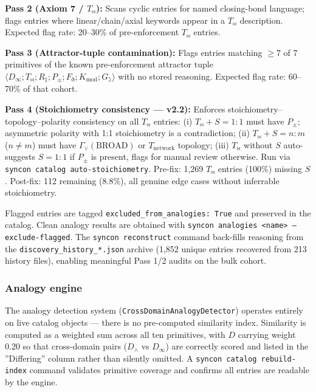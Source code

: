 \documentclass[12pt,a4paper]{article}
\begin{document}
\textbf{Pass 2 (Axiom 7 / $T_{\bowtie}$):} Scans cyclic entries for named closing-bond language; flags entries where linear/chain/axial keywords appear in a $T_{\bowtie}$ description. Expected flag rate: 20--30\% of pre-enforcement $T_{\bowtie}$ entries.

\textbf{Pass 3 (Attractor-tuple contamination):} Flags entries matching $\geq$7 of 7 primitives of the known pre-enforcement attractor tuple $\langle D_{\infty}; T_{\bowtie}; R_{\ddagger}; P_{\pm}; F_{\eth}; K_{\text{mod}}; G_{\gimel} \rangle$ with no stored reasoning. Expected flag rate: 60--70\% of that cohort.

\textbf{Pass 4 (Stoichiometry consistency --- v2.2):} Enforces stoichiometry--topology--polarity consistency on all $T_{\bowtie}$ entries: (i) $T_{\bowtie} + S = 1:1$ must have $P_{\pm}$; asymmetric polarity with 1:1 stoichiometry is a contradiction; (ii) $T_{\bowtie} + S = n:m$ ($n \neq m$) must have $\Gamma_{\vee}(\text{BROAD})$ or $T_{\text{network}}$ topology; (iii) $T_{\bowtie}$ without $S$ auto-suggests $S = 1:1$ if $P_{\pm}$ is present, flags for manual review otherwise. Run via \texttt{syncon catalog auto-stoichiometry}. Pre-fix: 1,269 $T_{\bowtie}$ entries (100\%) missing $S$. Post-fix: 112 remaining (8.8\%), all genuine edge cases without inferrable stoichiometry.

Flagged entries are tagged \texttt{excluded\_from\_analogies: True} and preserved in the catalog. Clean analogy results are obtained with \texttt{syncon analogies \textless{}name\textgreater{} --exclude-flagged}. The \texttt{syncon reconstruct} command back-fills reasoning from the \texttt{discovery\_history\_*.json} archive (1,852 unique entries recovered from 213 history files), enabling meaningful Pass 1/2 audits on the bulk cohort.

\subsubsection{Analogy engine}

The analogy detection system (\texttt{CrossDomainAnalogyDetector}) operates entirely on live catalog objects --- there is no pre-computed similarity index. Similarity is computed as a weighted sum across all ten primitives, with $D$ carrying weight 0.20 so that cross-domain pairs ($D_{\wedge}$ vs $D_{\infty}$) are correctly scored and listed in the ''Differing'' column rather than silently omitted. A \texttt{syncon catalog rebuild-index} command validates primitive coverage and confirms all entries are readable by the engine.
\end{document}
